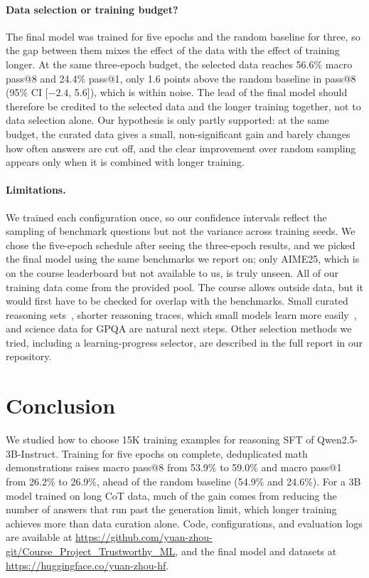 \documentclass{article}
\makeatletter
\newcommand{\passk}[1]{pass@#1}
\makeatother
\begin{document}
\paragraph{Data selection or training budget?} The final model was trained for five epochs and the random baseline for three,
so the gap between them mixes the effect of the data with the effect of training longer. At the same three-epoch budget, the
selected data reaches 56.6\% macro \passk{8} and 24.4\% \passk{1}, only 1.6 points above the random baseline in \passk{8}
(95\% CI [$-2.4$, 5.6]), which is within noise. The lead of the final model should therefore be credited to the selected data
and the longer training together, not to data selection alone. Our hypothesis is only partly supported: at the same budget,
the curated data gives a small, non-significant gain and barely changes how often answers are cut off, and the clear
improvement over random sampling appears only when it is combined with longer training.

\paragraph{Limitations.} We trained each configuration once, so our confidence intervals reflect the sampling of benchmark
questions but not the variance across training seeds. We chose the five-epoch schedule after seeing the three-epoch results,
and we picked the final model using the same benchmarks we report on; only AIME25, which is on the course leaderboard but not
available to us, is truly unseen. All of our training data come from the provided pool. The course allows outside data, but it
would first have to be checked for overlap with the benchmarks. Small curated reasoning sets~\citep{s1,limo}, shorter reasoning
traces, which small models learn more easily~\citep{li2025small}, and science data for GPQA are natural next steps. Other selection methods we tried,
including a learning-progress selector, are described in the full report in our repository.

\section{Conclusion}

We studied how to choose 15K training examples for reasoning SFT of Qwen2.5-3B-Instruct. Training for five epochs on complete,
deduplicated math demonstrations raises macro \passk{8} from 53.9\% to 59.0\% and macro \passk{1} from 26.2\% to 26.9\%, ahead
of the random baseline (54.9\% and 24.6\%). For a 3B model trained on long CoT data, much of the gain comes from reducing the
number of answers that run past the generation limit, which longer training achieves more than data curation alone. Code, configurations, and evaluation logs are available at
\url{https://github.com/yuan-zhou-git/Course_Project_Trustworthy_ML}, and the final model and datasets at
\url{https://huggingface.co/yuan-zhou-hf}.



\end{document}
